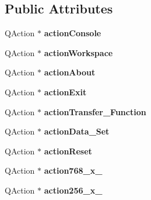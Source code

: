 \subsection*{\-Public \-Attributes}
\begin{DoxyCompactItemize}
\item 
\hypertarget{class_ui___main_window_a1f7825e3219647ef7f27069d09e569e6}{\-Q\-Action $\ast$ {\bfseries action\-Console}}\label{class_ui___main_window_a1f7825e3219647ef7f27069d09e569e6}

\item 
\hypertarget{class_ui___main_window_ac55648af9ee5c63085159d5ef66c21b0}{\-Q\-Action $\ast$ {\bfseries action\-Workspace}}\label{class_ui___main_window_ac55648af9ee5c63085159d5ef66c21b0}

\item 
\hypertarget{class_ui___main_window_a443f62303ccf5d68743d0eb6c34fba7f}{\-Q\-Action $\ast$ {\bfseries action\-About}}\label{class_ui___main_window_a443f62303ccf5d68743d0eb6c34fba7f}

\item 
\hypertarget{class_ui___main_window_a2a464e9b320ef81b8a5d3a1d54a41206}{\-Q\-Action $\ast$ {\bfseries action\-Exit}}\label{class_ui___main_window_a2a464e9b320ef81b8a5d3a1d54a41206}

\item 
\hypertarget{class_ui___main_window_a302d699ddb4aa25d40c5a903e6d176aa}{\-Q\-Action $\ast$ {\bfseries action\-Transfer\-\_\-\-Function}}\label{class_ui___main_window_a302d699ddb4aa25d40c5a903e6d176aa}

\item 
\hypertarget{class_ui___main_window_a77aa72c48aa3f51add8112db2763cd03}{\-Q\-Action $\ast$ {\bfseries action\-Data\-\_\-\-Set}}\label{class_ui___main_window_a77aa72c48aa3f51add8112db2763cd03}

\item 
\hypertarget{class_ui___main_window_ab441c518dcdcdc6725a1774629a34b0a}{\-Q\-Action $\ast$ {\bfseries action\-Reset}}\label{class_ui___main_window_ab441c518dcdcdc6725a1774629a34b0a}

\item 
\hypertarget{class_ui___main_window_a14889d63894fcf36e222778a150bbbbe}{\-Q\-Action $\ast$ {\bfseries action768\-\_\-x\-\_}}\label{class_ui___main_window_a14889d63894fcf36e222778a150bbbbe}

\item 
\hypertarget{class_ui___main_window_a7ab9354a151adfac3aa0bc1305c84727}{\-Q\-Action $\ast$ {\bfseries action256\-\_\-x\-\_}}\label{class_ui___main_window_a7ab9354a151adfac3aa0bc1305c84727}


\end{DoxyCompactItemize}

